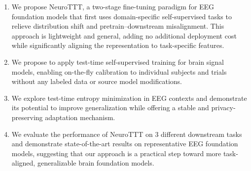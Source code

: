 \documentclass{article} %
\begin{document}
\begin{enumerate}
    \item We propose NeuroTTT, a two-stage fine-tuning paradigm for EEG foundation models that first uses domain-specific self-supervised tasks to relieve distribution shift and pretrain–downstream misalignment. This approach is lightweight and general, adding no additional deployment cost while significantly aligning the representation to task-specific features.
    \item We propose to apply test-time self-supervised training for brain signal models, enabling on-the-fly calibration to individual subjects and trials without any labeled data or source model modifications.
    \item We explore test-time entropy minimization in EEG contexts and demonstrate its potential to improve generalization while offering a stable and privacy-preserving adaptation mechanism.
    \item We evaluate the performance of NeuroTTT on 3 different downstream tasks and demonstrate state-of-the-art results on representative EEG foundation models, suggesting that our approach is a practical step toward more task-aligned, generalizable brain foundation models.
\end{enumerate}




\end{document}
